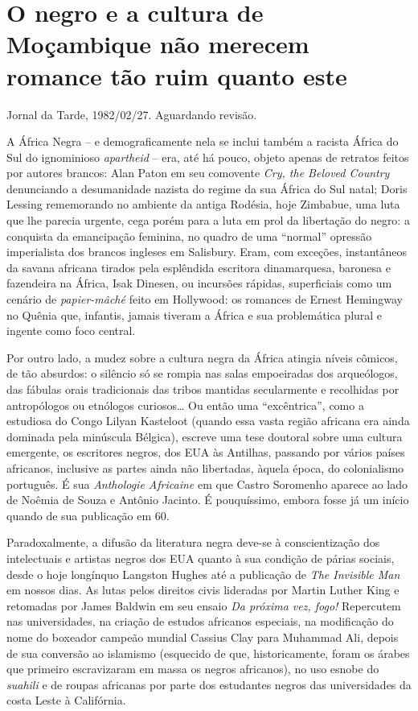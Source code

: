 \documentclass[
  letterpaper,
  DIV=11,
  numbers=noendperiod]{scrreprt}
\begin{document}
\chapter{O negro e a cultura de Moçambique não merecem romance tão ruim
quanto
este}\label{o-negro-e-a-cultura-de-mouxe7ambique-nuxe3o-merecem-romance-tuxe3o-ruim-quanto-este}

Jornal da Tarde, 1982/02/27. Aguardando revisão.

\hfill\break

A África Negra -- e demograficamente nela se inclui também a racista
África do Sul do ignominioso \emph{apartheid} -- era, até há pouco,
objeto apenas de retratos feitos por autores brancos: Alan Paton em seu
comovente \emph{Cry, the Beloved Country} denunciando a desumanidade
nazista do regime da sua África do Sul natal; Doris Lessing rememorando
no ambiente da antiga Rodésia, hoje Zimbabue, uma luta que lhe parecia
urgente, cega porém para a luta em prol da libertação do negro: a
conquista da emancipação feminina, no quadro de uma ``normal'' opressão
imperialista dos brancos ingleses em Salisbury. Eram, com exceções,
instantâneos da savana africana tirados pela esplêndida escritora
dinamarquesa, baronesa e fazendeira na África, Isak Dinesen, ou
incursões rápidas, superficiais como um cenário de \emph{papier-mâché}
feito em Hollywood: os romances de Ernest Hemingway no Quênia que,
infantis, jamais tiveram a África e sua problemática plural e ingente
como foco central.

Por outro lado, a mudez sobre a cultura negra da África atingia níveis
cômicos, de tão absurdos: o silêncio só se rompia nas salas empoeiradas
dos arqueólogos, das fábulas orais tradicionais das tribos mantidas
secularmente e recolhidas por antropólogos ou etnólogos curiosos\ldots{}
Ou então uma ``excêntrica'', como a estudiosa do Congo Lilyan Kasteloot
(quando essa vasta região africana era ainda dominada pela minúscula
Bélgica), escreve uma tese doutoral sobre uma cultura emergente, os
escritores negros, dos EUA às Antilhas, passando por vários países
africanos, inclusive as partes ainda não libertadas, àquela época, do
colonialismo português. É sua \emph{Anthologie Africaine} em que Castro
Soromenho aparece ao lado de Noêmia de Souza e Antônio Jacinto. É
pouquíssimo, embora fosse já um início quando de sua publicação em 60.

Paradoxalmente, a difusão da literatura negra deve-se à conscientização
dos intelectuais e artistas negros dos EUA quanto à sua condição de
párias sociais, desde o hoje longínquo Langston Hughes até a publicação
de \emph{The Invisible Man} em nossos dias. As lutas pelos direitos
civis lideradas por Martin Luther King e retomadas por James Baldwin em
seu ensaio \emph{Da próxima vez, fogo!} Repercutem nas universidades, na
criação de estudos africanos especiais, na modificação do nome do
boxeador campeão mundial Cassius Clay para Muhammad Ali, depois de sua
conversão ao islamismo (esquecido de que, historicamente, foram os
árabes que primeiro escravizaram em massa os negros africanos), no uso
esnobe do \emph{suahili} e de roupas africanas por parte dos estudantes
negros das universidades da costa Leste à Califórnia.
\end{document}
